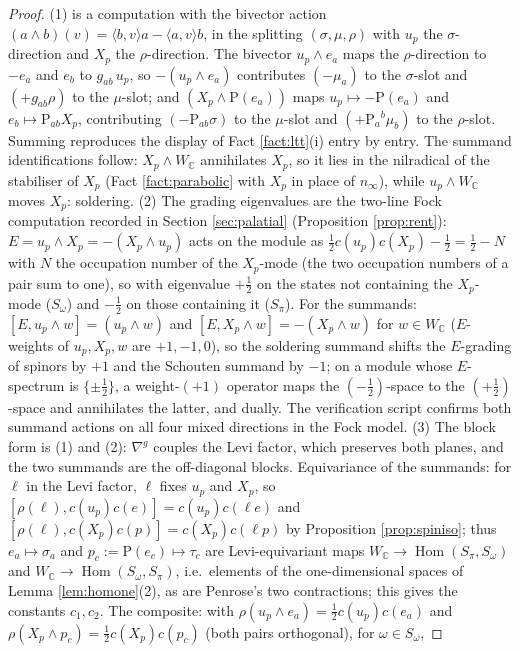 \documentclass[11pt]{article}
\theoremstyle{definition}
\newcommand{\C}{\mathbb{C}}
\newcommand{\nInf}{n_\infty}
\newcommand{\ip}[2]{\langle #1, #2\rangle}
\newcommand{\Som}{S_\omega}
\newcommand{\Spi}{S_\pi}
\begin{document}
\begin{proof}
(1) is a computation with the bivector action $(a\wedge b)(v) = \ip{b}{v}a - \ip{a}{v}b$, in the splitting $(\sigma, \mu, \rho)$ with $u_p$ the $\sigma$-direction and $X_p$ the $\rho$-direction. The bivector $u_p\wedge e_a$ maps the $\rho$-direction to $-e_a$ and $e_b$ to $g_{ab}\,u_p$, so $-(u_p\wedge e_a)$ contributes $(-\mu_a)$ to the $\sigma$-slot and $(+g_{ab}\rho)$ to the $\mu$-slot; and $(X_p\wedge \mathrm{P}(e_a))$ maps $u_p \mapsto -\mathrm{P}(e_a)$ and $e_b \mapsto \mathrm{P}_{ab}X_p$, contributing $(-\mathrm{P}_{ab}\sigma)$ to the $\mu$-slot and $(+\mathrm{P}_a{}^b\mu_b)$ to the $\rho$-slot. Summing reproduces the display of Fact \ref{fact:ltt}(i) entry by entry. The summand identifications follow: $X_p\wedge W_\C$ annihilates $X_p$, so it lies in the nilradical of the stabiliser of $X_p$ (Fact \ref{fact:parabolic} with $X_p$ in place of $\nInf$), while $u_p \wedge W_\C$ moves $X_p$: soldering.
(2) The grading eigenvalues are the two-line Fock computation recorded in Section \ref{sec:palatial} (Proposition \ref{prop:rent}): $E = u_p\wedge X_p = -(X_p\wedge u_p)$ acts on the module as $\tfrac12 c(u_p)c(X_p) - \tfrac12 = \tfrac12 - N$ with $N$ the occupation number of the $X_p$-mode (the two occupation numbers of a pair sum to one), so with eigenvalue $+\tfrac12$ on the states not containing the $X_p$-mode ($\Som$) and $-\tfrac12$ on those containing it ($\Spi$). For the summands: $[E, u_p\wedge w] = (u_p\wedge w)$ and $[E, X_p\wedge w] = -(X_p\wedge w)$ for $w \in W_\C$ ($E$-weights of $u_p, X_p, w$ are $+1, -1, 0$), so the soldering summand shifts the $E$-grading of spinors by $+1$ and the Schouten summand by $-1$; on a module whose $E$-spectrum is $\{\pm\tfrac12\}$, a weight-$(+1)$ operator maps the $(-\tfrac12)$-space to the $(+\tfrac12)$-space and annihilates the latter, and dually. The verification script confirms both summand actions on all four mixed directions in the Fock model.
(3) The block form is (1) and (2): $\nabla^g$ couples the Levi factor, which preserves both planes, and the two summands are the off-diagonal blocks. Equivariance of the summands: for $\ell$ in the Levi factor, $\ell$ fixes $u_p$ and $X_p$, so $[\rho(\ell), c(u_p)c(e)] = c(u_p)c(\ell e)$ and $[\rho(\ell), c(X_p)c(p)] = c(X_p)c(\ell p)$ by Proposition \ref{prop:spiniso}; thus $e_a \mapsto \sigma_a$ and $p_c := \mathrm{P}(e_c) \mapsto \tau_c$ are Levi-equivariant maps $W_\C \to \operatorname{Hom}(\Spi,\Som)$ and $W_\C\to\operatorname{Hom}(\Som,\Spi)$, i.e.\ elements of the one-dimensional spaces of Lemma \ref{lem:homone}(2), as are Penrose's two contractions; this gives the constants $c_1, c_2$. The composite: with $\rho(u_p\wedge e_a) = \tfrac12 c(u_p)c(e_a)$ and $\rho(X_p\wedge p_c) = \tfrac12 c(X_p)c(p_c)$ (both pairs orthogonal), for $\omega \in \Som$,

\end{proof}
\end{document}
